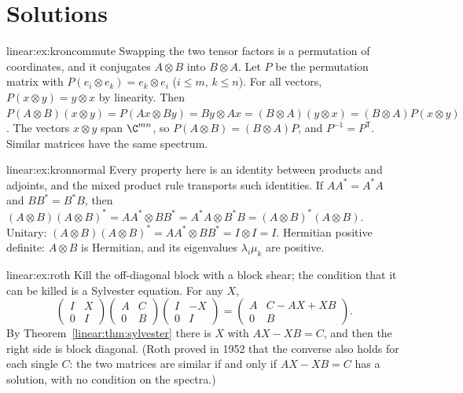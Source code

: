 \section{Solutions}

\begin{solution}{linear:ex:kroncommute}
\idea Swapping the two tensor factors is a permutation of coordinates, and it conjugates $A\otimes B$ into $B\otimes A$.
\writeup Let $P$ be the permutation matrix with $P(e_i\otimes e_k)=e_k\otimes e_i$ ($i\le m$, $k\le n$). For all vectors,
$P(x\otimes y)=y\otimes x$ by linearity. Then $P(A\otimes B)(x\otimes y)=P(Ax\otimes By)=By\otimes Ax=(B\otimes A)(y\otimes x)=(B\otimes A)
P(x\otimes y)$. The vectors $x\otimes y$ span $\C^{mn}$, so $P(A\otimes B)=(B\otimes A)P$, and $P^{-1}=P^{\mathsf T}$. Similar matrices
have the same spectrum.
\end{solution}

\begin{solution}{linear:ex:kronnormal}
\idea Every property here is an identity between products and adjoints, and the mixed product rule transports such identities.
\writeup If $AA^*=A^*A$ and $BB^*=B^*B$, then $(A\otimes B)(A\otimes B)^*=AA^*\otimes BB^*=A^*A\otimes B^*B=(A\otimes B)^*(A\otimes B)$.
Unitary: $(A\otimes B)(A\otimes B)^*=AA^*\otimes BB^*=I\otimes I=I$. Hermitian positive definite: $A\otimes B$ is Hermitian, and its eigenvalues
$\lambda_i\mu_k$ are positive.
\end{solution}

\begin{solution}{linear:ex:roth}
\idea Kill the off-diagonal block with a block shear; the condition that it can be killed is a Sylvester equation.
\writeup For any $X$,
\[
\begin{pmatrix}I&X\\0&I\end{pmatrix}\begin{pmatrix}A&C\\0&B\end{pmatrix}\begin{pmatrix}I&-X\\0&I\end{pmatrix}=\begin{pmatrix}A&C-AX+XB\\0&B
\end{pmatrix}.
\]
By Theorem~\ref{linear:thm:sylvester} there is $X$ with $AX-XB=C$, and then the right side is block diagonal. (Roth proved in 1952 that
the converse also holds for each single $C$: the two matrices are similar if and only if $AX-XB=C$ has a solution, with no
condition on the spectra.)
\end{solution}

